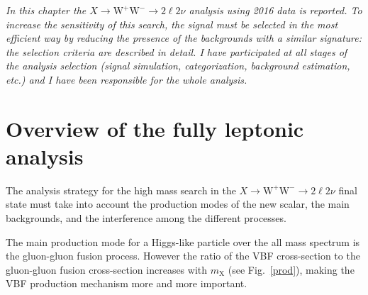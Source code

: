 
\textit{%
In this chapter the $X \to \mathrm{W^+W^-}\to2\ell2\nu$ analysis using 2016 data is reported. To increase the sensitivity of this search, the signal must be selected in the most efficient way by reducing the
presence of the backgrounds with a similar signature: the selection criteria are described in detail. I have participated at all stages of the analysis selection (signal simulation, categorization, background estimation, etc.)  and I have been responsible for the whole analysis.} 

\section{Overview of the fully leptonic analysis }\label{sec:AnalysisStrategy_Intro}
The analysis strategy for the high mass search in the $X \to \mathrm{W^+W^-}\to2\ell2\nu$ final state must take into account the production modes of the new scalar, the main backgrounds, and the interference among the different processes. 

The main production mode for a Higgs-like particle over the all mass spectrum is the gluon-gluon fusion process. 
However the ratio of the VBF cross-section to the gluon-gluon fusion cross-section increases with $m_\mathrm{X}$ (see Fig.~\ref{prod}), making the VBF production mechanism more and more important.\\

